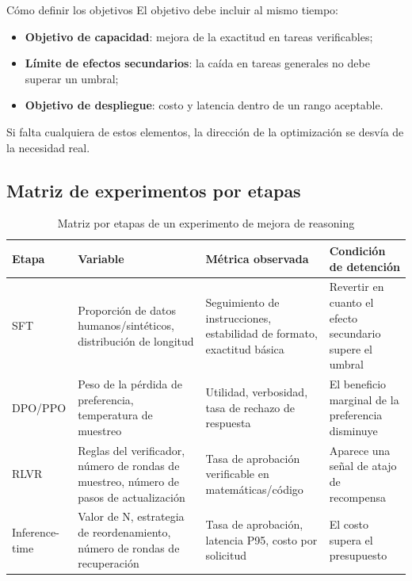 \documentclass[a4paper]{article}
\begin{document}
\begin{importantbox}{Cómo definir los objetivos}
El objetivo debe incluir al mismo tiempo:
\begin{itemize}
    \item \textbf{Objetivo de capacidad}: mejora de la exactitud en tareas verificables;
    \item \textbf{Límite de efectos secundarios}: la caída en tareas generales no debe superar un umbral;
    \item \textbf{Objetivo de despliegue}: costo y latencia dentro de un rango aceptable.
\end{itemize}
Si falta cualquiera de estos elementos, la dirección de la optimización se desvía de la necesidad real.
\end{importantbox}

\subsection{Matriz de experimentos por etapas}
\begin{table}[H]
\centering
\renewcommand{\arraystretch}{1.2}
\begin{tabular}{p{2.8cm}p{3.4cm}p{3.8cm}p{3.0cm}}
\toprule
\textbf{Etapa} & \textbf{Variable} & \textbf{Métrica observada} & \textbf{Condición de detención} \\
\midrule
SFT & Proporción de datos humanos/sintéticos, distribución de longitud & Seguimiento de instrucciones, estabilidad de formato, exactitud básica & Revertir en cuanto el efecto secundario supere el umbral \\
DPO/PPO & Peso de la pérdida de preferencia, temperatura de muestreo & Utilidad, verbosidad, tasa de rechazo de respuesta & El beneficio marginal de la preferencia disminuye \\
RLVR & Reglas del verificador, número de rondas de muestreo, número de pasos de actualización & Tasa de aprobación verificable en matemáticas/código & Aparece una señal de atajo de recompensa \\
Inference-time & Valor de N, estrategia de reordenamiento, número de rondas de recuperación & Tasa de aprobación, latencia P95, costo por solicitud & El costo supera el presupuesto \\
\bottomrule
\end{tabular}
\caption{Matriz por etapas de un experimento de mejora de reasoning}
\end{table}
\end{document}
